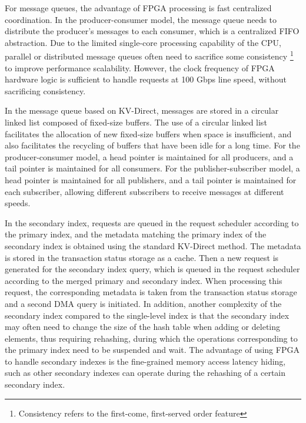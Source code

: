 For message queues, the advantage of FPGA processing is fast centralized coordination. In the producer-consumer model, the message queue needs to distribute the producer's messages to each consumer, which is a centralized FIFO abstraction. Due to the limited single-core processing capability of the CPU, parallel or distributed message queues often need to sacrifice some consistency \footnote{Consistency refers to the first-come, first-served order feature} to improve performance scalability. However, the clock frequency of FPGA hardware logic is sufficient to handle requests at 100 Gbps line speed, without sacrificing consistency.

In the message queue based on KV-Direct, messages are stored in a circular linked list composed of fixed-size buffers. The use of a circular linked list facilitates the allocation of new fixed-size buffers when space is insufficient, and also facilitates the recycling of buffers that have been idle for a long time. For the producer-consumer model, a head pointer is maintained for all producers, and a tail pointer is maintained for all consumers. For the publisher-subscriber model, a head pointer is maintained for all publishers, and a tail pointer is maintained for each subscriber, allowing different subscribers to receive messages at different speeds.

In the secondary index, requests are queued in the request scheduler according to the primary index, and the metadata matching the primary index of the secondary index is obtained using the standard KV-Direct method. The metadata is stored in the transaction status storage as a cache. Then a new request is generated for the secondary index query, which is queued in the request scheduler according to the merged primary and secondary index. When processing this request, the corresponding metadata is taken from the transaction status storage and a second DMA query is initiated. In addition, another complexity of the secondary index compared to the single-level index is that the secondary index may often need to change the size of the hash table when adding or deleting elements, thus requiring rehashing, during which the operations corresponding to the primary index need to be suspended and wait. The advantage of using FPGA to handle secondary indexes is the fine-grained memory access latency hiding, such as other secondary indexes can operate during the rehashing of a certain secondary index.
